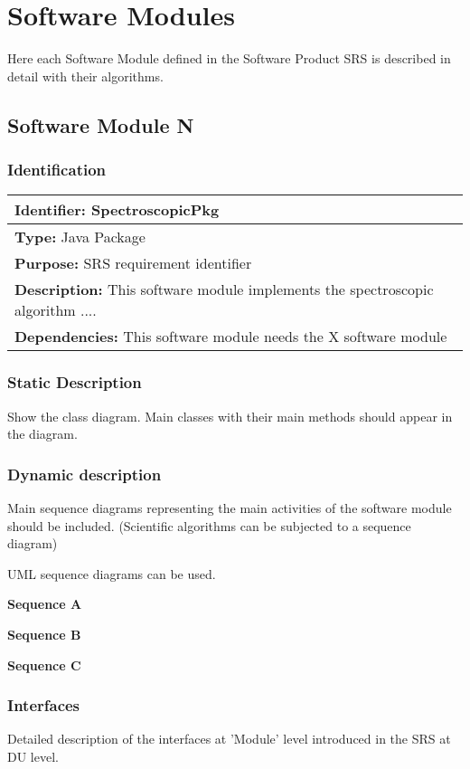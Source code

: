 \documentclass[SDCCH,esgsdraft,SDD]{esgsdoc}
\begin{document}
\section{Software Modules}
Here each Software Module defined in the Software Product SRS is
described in detail with their algorithms.

\subsection{Software Module N}

\subsubsection{Identification}
\begin{longtable}{|p{}|}\hline
{\bf Identifier:} SpectroscopicPkg \\\hline
{\bf Type:} Java Package \\\hline
{\bf Purpose:} SRS requirement identifier\\\hline
{\bf Description:} This software module implements the spectroscopic algorithm ....\\\hline
{\bf Dependencies:} This software module needs the X software module\\\hline
\end{longtable} \normalsize
\subsubsection{Static Description}
Show the class diagram. Main classes with their main methods should appear in the diagram.
\subsubsection{Dynamic description}
Main sequence diagrams representing the main activities of the software module should be included. (Scientific algorithms can be subjected to a sequence diagram)

UML sequence diagrams can be used.


{\bf Sequence A}

{\bf Sequence B}

{\bf Sequence C}


\subsubsection{Interfaces}

Detailed description of the interfaces at 'Module' level introduced in the SRS at DU level.
\end{document}
